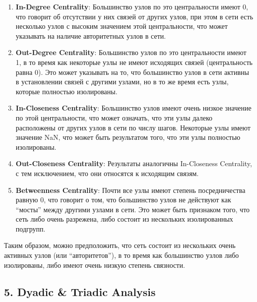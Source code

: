\documentclass[
]{article}
\begin{document}
\begin{enumerate}
\def\labelenumi{\arabic{enumi}.}
\item
  \textbf{In-Degree Centrality}: Большинство узлов по это центральности
  имеют 0, что говорит об отсутствии у них связей от других узлов, при
  этом в сети есть несколько узлов с высоким значением этой
  центральности, что может указывать на наличие авторитетных узлов в
  сети.
\item
  \textbf{Out-Degree Centrality}: Большинство узлов по это центральности
  имеют 1, в то время как некоторые узлы не имеют исходящих связей
  (центральность равна 0). Это может указывать на то, что большинство
  узлов в сети активны в установлении связей с другими узлами, но в то
  же время есть узлы, которые полностью изолированы.
\item
  \textbf{In-Closeness Centrality}: Большинство узлов имеют очень низкое
  значение по этой центральности, что может означать, что эти узлы
  далеко расположены от других узлов в сети по числу шагов. Некоторые
  узлы имеют значение NaN, что может быть результатом того, что эти узлы
  полностью изолированы.
\item
  \textbf{Out-Closeness Centrality}: Результаты аналогичны In-Closeness
  Centrality, с тем исключением, что они относятся к исходящим связям.
\item
  \textbf{Betweenness Centrality}: Почти все узлы имеют степень
  посредничества равную 0, что говорит о том, что большинство узлов не
  действуют как ``мосты'' между другими узлами в сети. Это может быть
  признаком того, что сеть либо очень разрежена, либо состоит из
  нескольких изолированных подгрупп.
\end{enumerate}

Таким образом, можно предположить, что сеть состоит из нескольких очень
активных узлов (или ``авторитетов''), в то время как большинство узлов
либо изолированы, либо имеют очень низкую степень связности.

\hypertarget{dyadic-triadic-analysis}{%
\subsection{5. Dyadic \& Triadic
Analysis}\label{dyadic-triadic-analysis}}
\end{document}
